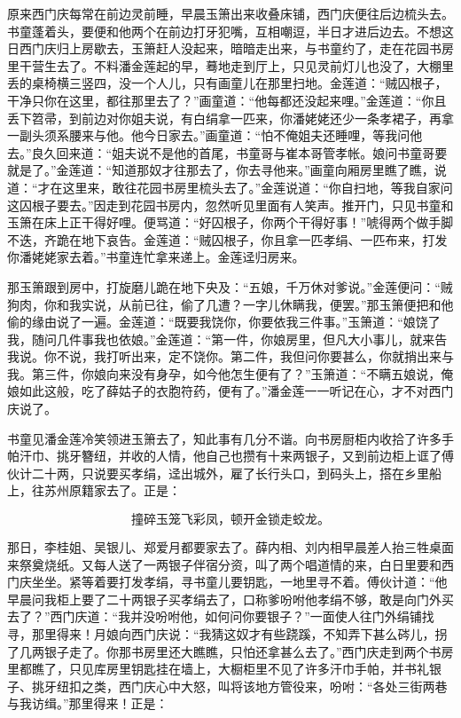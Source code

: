 原来西门庆每常在前边灵前睡，早晨玉箫出来收叠床铺，西门庆便往后边梳头去。书童蓬着头，要便和他两个在前边打牙犯嘴，互相嘲逗，半日才进后边去。不想这日西门庆归上房歇去，玉箫赶人没起来，暗暗走出来，与书童约了，走在花园书房里干营生去了。不料潘金莲起的早，蓦地走到厅上，只见灵前灯儿也没了，大棚里丢的桌椅横三竖四，没一个人儿，只有画童儿在那里扫地。金莲道：“贼囚根子，干净只你在这里，都往那里去了？”画童道：“他每都还没起来哩。”金莲道：“你且丢下笤帚，到前边对你姐夫说，有白绢拿一匹来，你潘姥姥还少一条孝裙子，再拿一副头须系腰来与他。他今日家去。”画童道：“怕不俺姐夫还睡哩，等我问他去。”良久回来道：“姐夫说不是他的首尾，书童哥与崔本哥管孝帐。娘问书童哥要就是了。”金莲道：“知道那奴才往那去了，你去寻他来。”画童向厢房里瞧了瞧，说道：“才在这里来，敢往花园书房里梳头去了。”金莲说道：“你自扫地，等我自家问这囚根子要去。”因走到花园书房内，忽然听见里面有人笑声。推开门，只见书童和玉箫在床上正干得好哩。便骂道：“好囚根子，你两个干得好事！”唬得两个做手脚不迭，齐跪在地下哀告。金莲道：“贼囚根子，你且拿一匹孝绢、一匹布来，打发你潘姥姥家去着。”书童连忙拿来递上。金莲迳归房来。

那玉箫跟到房中，打旋磨儿跪在地下央及：“五娘，千万休对爹说。”金莲便问：“贼狗肉，你和我实说，从前已往，偷了几遭？一字儿休瞒我，便罢。”那玉箫便把和他偷的缘由说了一遍。金莲道：“既要我饶你，你要依我三件事。”玉箫道：“娘饶了我，随问几件事我也依娘。”金莲道：“第一件，你娘房里，但凡大小事儿，就来告我说。你不说，我打听出来，定不饶你。第二件，我但问你要甚么，你就捎出来与我。第三件，你娘向来没有身孕，如今他怎生便有了？”玉箫道：“不瞒五娘说，俺娘如此这般，吃了薛姑子的衣胞符药，便有了。”潘金莲一一听记在心，才不对西门庆说了。

书童见潘金莲冷笑领进玉箫去了，知此事有几分不谐。向书房厨柜内收拾了许多手帕汗巾、挑牙簪纽，并收的人情，他自己也攒有十来两银子，又到前边柜上诓了傅伙计二十两，只说要买孝绢，迳出城外，雇了长行头口，到码头上，搭在乡里船上，往苏州原籍家去了。正是：

\[
撞碎玉笼飞彩凤，顿开金锁走蛟龙。
\]

那日，李桂姐、吴银儿、郑爱月都要家去了。薛内相、刘内相早晨差人抬三牲桌面来祭奠烧纸。又每人送了一两银子伴宿分资，叫了两个唱道情的来，白日里要和西门庆坐坐。紧等着要打发孝绢，寻书童儿要钥匙，一地里寻不着。傅伙计道：“他早晨问我柜上要了二十两银子买孝绢去了，口称爹吩咐他孝绢不够，敢是向门外买去了？”西门庆道：“我并没吩咐他，如何问你要银子？”一面使人往门外绢铺找寻，那里得来！月娘向西门庆说：“我猜这奴才有些跷蹊，不知弄下甚么硶儿，拐了几两银子走了。你那书房里还大瞧瞧，只怕还拿甚么去了。”西门庆走到两个书房里都瞧了，只见库房里钥匙挂在墙上，大橱柜里不见了许多汗巾手帕，并书礼银子、挑牙纽扣之类，西门庆心中大怒，叫将该地方管役来，吩咐：“各处三街两巷与我访缉。”那里得来！正是：

